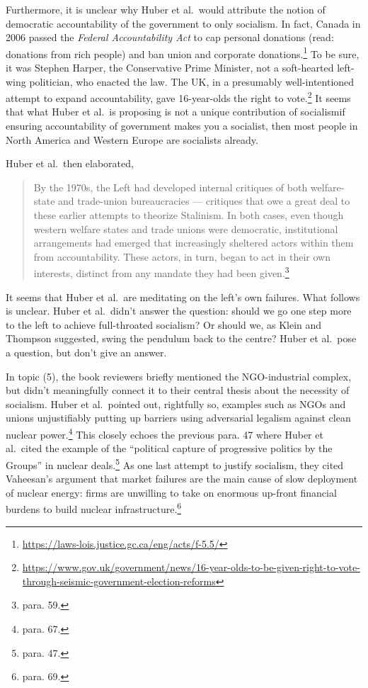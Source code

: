 \documentclass[12pt]{article}
\begin{document}
Furthermore, it is unclear why Huber et al.\ would attribute the notion of democratic accountability of the government to only socialism. In fact, Canada in 2006 passed the \textit{Federal Accountability Act} to cap personal donations (read: donations from rich people) and ban union and corporate donations.\footnote{\href{https://laws-lois.justice.gc.ca/eng/acts/f-5.5/}{https://laws-lois.justice.gc.ca/eng/acts/f-5.5/}} To be sure, it was Stephen Harper, the Conservative Prime Minister, not a soft-hearted left-wing politician, who enacted the law. The UK, in a presumably well-intentioned attempt to expand accountability, gave 16-year-olds the right to vote.\footnote{\href{https://www.gov.uk/government/news/16-year-olds-to-be-given-right-to-vote-through-seismic-government-election-reforms}{https://www.gov.uk/government/news/16-year-olds-to-be-given-right-to-vote-through-seismic-government-election-reforms}} It seems that what Huber et al.\ is proposing is not a unique contribution of socialism\textemdash{}if ensuring accountability of government makes you a socialist, then most people in North America and Western Europe are socialists already.

Huber et al.\ then elaborated,

\begin{quotation}
	By the 1970s, the Left had developed internal critiques of both welfare-state and trade-union bureaucracies — critiques that owe a great deal to these earlier attempts to theorize Stalinism. In both cases, even though western welfare states and trade unions were democratic, institutional arrangements had emerged that increasingly sheltered actors within them from accountability. These actors, in turn, began to act in their own interests, distinct from any mandate they had been given.\footnote{para. 59.}
\end{quotation}

It seems that Huber et al.\ are meditating on the left's own failures. What follows is unclear. Huber et al.\ didn't answer the question: should we go one step more to the left to achieve full-throated socialism? Or should we, as Klein and Thompson suggested, swing the pendulum back to the centre? Huber et al.\ pose a question, but don't give an answer.

In topic (5), the book reviewers briefly mentioned the NGO-industrial complex, but didn't meaningfully connect it to their central thesis about the necessity of socialism. Huber et al.\ pointed out, rightfully so, examples such as NGOs and unions unjustifiably putting up barriers using adversarial legalism against clean nuclear power.\footnote{para. 67.} This closely echoes the previous para. 47 where Huber et al.\ cited the example of the ``political capture of progressive politics by the Groups'' in nuclear deals.\footnote{para. 47.} As one last attempt to justify socialism, they cited Vaheesan's argument that market failures are the main cause of slow deployment of nuclear energy: firms are unwilling to take on enormous up-front financial burdens to build nuclear infrastructure.\footnote{para. 69.}
\end{document}
